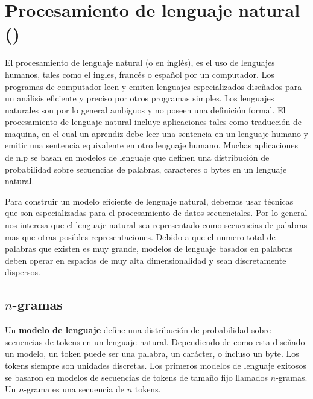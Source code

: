 
\section{Procesamiento de lenguaje natural ()}

El procesamiento de lenguaje natural (o  en inglés), es el uso de lenguajes humanos, tales como el ingles, francés o español por un computador. Los programas de computador leen y emiten lenguajes especializados diseñados para un análisis eficiente y preciso por otros programas simples. Los lenguajes naturales son por lo general ambiguos y no poseen una definición formal. El procesamiento de lenguaje natural incluye aplicaciones tales como traducción de maquina, en el cual un aprendiz debe leer una sentencia en un lenguaje humano y emitir una sentencia equivalente en otro lenguaje humano. Muchas aplicaciones de \gls{nlp} se basan en modelos de lenguaje que definen una distribución de probabilidad sobre secuencias de palabras, caracteres o bytes en un lenguaje natural.

Para construir un modelo eficiente de lenguaje natural, debemos usar técnicas que son especializadas para el procesamiento de datos secuenciales. Por lo general nos interesa que el lenguaje natural sea representado como secuencias de palabras mas que otras posibles representaciones. Debido a que el numero total de palabras que existen es muy grande, modelos de lenguaje basados en palabras deben operar en espacios de muy alta dimensionalidad y sean discretamente dispersos.

\subsection{$n$-gramas}
Un \textbf{modelo de lenguaje} define una distribución de probabilidad sobre secuencias de tokens en un lenguaje natural. Dependiendo de como esta diseñado un modelo, un token puede ser una palabra, un carácter, o incluso un byte. Los tokens siempre son unidades discretas. Los primeros modelos de lenguaje exitosos se basaron en modelos de secuencias de tokens de tamaño fijo llamados $n$-gramas. Un $n$-grama es una secuencia de $n$ tokens.

